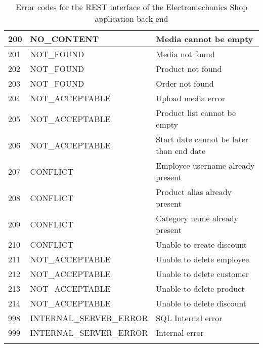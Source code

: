 \begin{longtable}{|p{}|p{}|p{}|}
200 & NO\_CONTENT & Media cannot be empty \\\hline
201 & NOT\_FOUND & Media not found \\\hline
202 & NOT\_FOUND & Product not found \\\hline
203 & NOT\_FOUND & Order not found \\\hline
204 & NOT\_ACCEPTABLE & Upload media error \\\hline
205 & NOT\_ACCEPTABLE & Product list cannot be empty \\\hline
206 & NOT\_ACCEPTABLE & Start date cannot be later than end date \\\hline
207 & CONFLICT & Employee username already present \\\hline
208 & CONFLICT & Product alias already present \\\hline
209 & CONFLICT & Category name already present \\\hline
210 & CONFLICT & Unable to create discount \\\hline
211 & NOT\_ACCEPTABLE & Unable to delete employee \\\hline
212 & NOT\_ACCEPTABLE & Unable to delete customer \\\hline
213 & NOT\_ACCEPTABLE & Unable to delete product \\\hline
214 & NOT\_ACCEPTABLE & Unable to delete discount \\\hline

998 & INTERNAL\_SERVER\_ERROR & SQL Internal error \\\hline
999 & INTERNAL\_SERVER\_ERROR & Internal error \\\hline

\caption{Error codes for the REST interface of the Electromechanics Shop application back-end}
\label{tab:ErrorRest}
\end{longtable}